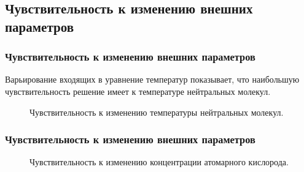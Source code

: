 \documentclass[9pt, apectratio=43,unicode]{beamer}
\begin{document}
\subsection{Чувствительность к изменению внешних параметров}
\begin{frame}\frametitle{Чувствительность к изменению внешних параметров}

Варьирование входящих в уравнение температур показывает, что наибольшую чувствительность решение имеет к температуре нейтральных молекул.

\begin{figure}
\caption{Чувствительность к изменению температуры нейтральных молекул.}
\end{figure}
\end{frame}

\begin{frame}\frametitle{Чувствительность к изменению внешних параметров}
\begin{figure}
\caption{Чувствительность к изменению концентрации атомарного кислорода.}
\end{figure}
\end{frame}
\end{document}
